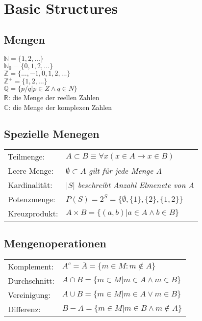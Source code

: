 \section{Basic Structures}

\subsection{Mengen}
$ \mathbb{N} = \{1, 2, \dots \} $ \\
$ \mathbb{N}_0 = \{0, 1, 2, \dots \} $ \\
$ \mathbb{Z} = \{ \dots , -1, 0, 1, 2, \dots \} $ \\
$ \mathbb{Z}^+ = \{1, 2, \dots \} $ \\
$ \mathbb{Q} = \{ p / q | p \in Z \land q \in N \} $ \\
$ \mathbb{R} $: die Menge der reellen Zahlen \\
$ \mathbb{C} $: die Menge der komplexen Zahlen \\

\subsection{Spezielle Menegen}
\begin{tabular}{ll}
    Teilmenge: & $ A \subset B \equiv \forall x (x \in A \rightarrow x \in B) $ \\
    Leere Menge: & $ \emptyset \subset A $ \textit{gilt für jede Menge A} \\
    Kardinalität: & $ |S| $ \textit{beschreibt Anzahl Elmenete von A} \\
    Potenzmenge: & $ P(S) = 2^S = \{ \emptyset , \{1\} , \{2\} , \{1, 2\} \} $ \\
    Kreuzprodukt: & $A \times B = \{(a, b) |a \in A \land b \in B \} $ \\
\end{tabular} 

\subsection{Mengenoperationen}
\begin{tabular}{ll}
    Komplement: & $ A^c = \overline{A} = \{ m \in M : m \notin A \} $ \\
    Durchschnitt: & $ A \cap B = \{ m \in M | m \in A \land m \in B \} $ \\
    Vereinigung: & $ A \cup B = \{ m \in M | m \in A \lor m \in B \} $ \\
    Differenz: & $ B - A = \{ m \in M | m \in B \land m \notin A \} $
\end{tabular} 

